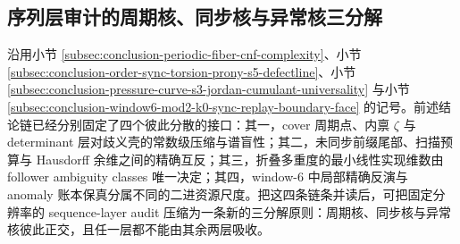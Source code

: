 \subsection{序列层审计的周期核、同步核与异常核三分解}\label{subsec:conclusion-sequence-layer-period-sync-anomaly-audit-decomposition}
沿用小节 \ref{subsec:conclusion-periodic-fiber-cnf-complexity}、小节 \ref{subsec:conclusion-order-sync-torsion-prony-s5-defectline}、小节 \ref{subsec:conclusion-pressure-curve-s3-jordan-cumulant-universality} 与小节 \ref{subsec:conclusion-window6-mod2-k0-sync-replay-boundary-face} 的记号。前述结论链已经分别固定了四个彼此分散的接口：其一，cover 周期点、内禀 \(\zeta\) 与 determinant 层对歧义壳的常数级压缩与谱盲性；其二，未同步前缀尾部、扫描预算与 Hausdorff 余维之间的精确互反；其三，折叠多重度的最小线性实现维数由 follower ambiguity classes 唯一决定；其四，window-\(6\) 中局部精确反演与 anomaly 账本保真分属不同的二进资源尺度。把这四条链条并读后，可把固定分辨率的 sequence-layer audit 压缩为一条新的三分解原则：周期核、同步核与异常核彼此正交，且任一层都不能由其余两层吸收。

